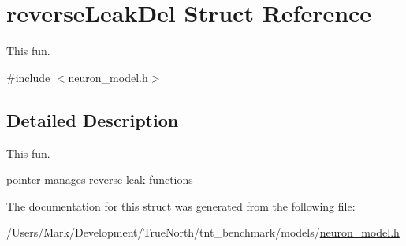 \hypertarget{structreverse_leak_del}{}\section{reverse\+Leak\+Del Struct Reference}
\label{structreverse_leak_del}


This fun.  




{\ttfamily \#include $<$neuron\+\_\+model.\+h$>$}



\subsection{Detailed Description}
This fun. 

pointer manages reverse leak functions 

The documentation for this struct was generated from the following file\+:\begin{DoxyCompactItemize}
\item 
/\+Users/\+Mark/\+Development/\+True\+North/tnt\+\_\+benchmark/models/\hyperlink{neuron__model_8h}{neuron\+\_\+model.\+h}\end{DoxyCompactItemize}
